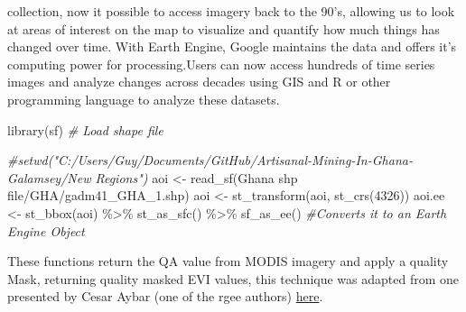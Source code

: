 \documentclass[10pt]{report}
\newenvironment{Shaded}{\begin{snugshade}}{\end{snugshade}}
\newcommand{\CommentTok}[1]{\textcolor[rgb]{0.56,0.35,0.01}{\textit{#1}}}
\newcommand{\DecValTok}[1]{\textcolor[rgb]{0.00,0.00,0.81}{#1}}
\newcommand{\FunctionTok}[1]{\textcolor[rgb]{0.00,0.00,0.00}{#1}}
\newcommand{\NormalTok}[1]{#1}
\newcommand{\OtherTok}[1]{\textcolor[rgb]{0.56,0.35,0.01}{#1}}
\newcommand{\SpecialCharTok}[1]{\textcolor[rgb]{0.00,0.00,0.00}{#1}}
\newcommand{\StringTok}[1]{\textcolor[rgb]{0.31,0.60,0.02}{#1}}
\begin{document}
collection, now it possible to access imagery back to the 90's, allowing
us to look at areas of interest on the map to visualize and quantify how
much things has changed over time. With Earth Engine, Google maintains
the data and offers it's computing power for processing.Users can now
access hundreds of time series images and analyze changes across decades
using GIS and R or other programming language to analyze these datasets.

\begin{Shaded}
\begin{Highlighting}[]
\FunctionTok{library}\NormalTok{(}\StringTok{\textquotesingle{}sf\textquotesingle{}}\NormalTok{)}
\CommentTok{\# Load shape file}

\CommentTok{\#setwd("C:/Users/Guy/Documents/GitHub/Artisanal{-}Mining{-}In{-}Ghana{-}Galamsey/New Regions")}
\NormalTok{aoi }\OtherTok{\textless{}{-}} \FunctionTok{read\_sf}\NormalTok{(}\StringTok{\textquotesingle{}Ghana shp file/GHA/gadm41\_GHA\_1.shp\textquotesingle{}}\NormalTok{)}
\NormalTok{aoi }\OtherTok{\textless{}{-}} \FunctionTok{st\_transform}\NormalTok{(aoi, }\FunctionTok{st\_crs}\NormalTok{(}\DecValTok{4326}\NormalTok{))}
\NormalTok{aoi.ee }\OtherTok{\textless{}{-}} \FunctionTok{st\_bbox}\NormalTok{(aoi) }\SpecialCharTok{\%\textgreater{}\%} 
\FunctionTok{st\_as\_sfc}\NormalTok{() }\SpecialCharTok{\%\textgreater{}\%} 
\FunctionTok{sf\_as\_ee}\NormalTok{() }\CommentTok{\#Converts it to an Earth Engine Object}
\end{Highlighting}
\end{Shaded}

These functions return the QA value from MODIS imagery and apply a
quality Mask, returning quality masked EVI values, this technique was
adapted from one presented by Cesar Aybar (one of the rgee authors)
\href{https://csaybar.github.io/blog/2020/06/15/rgee_02_io/}{here}.
\end{document}
